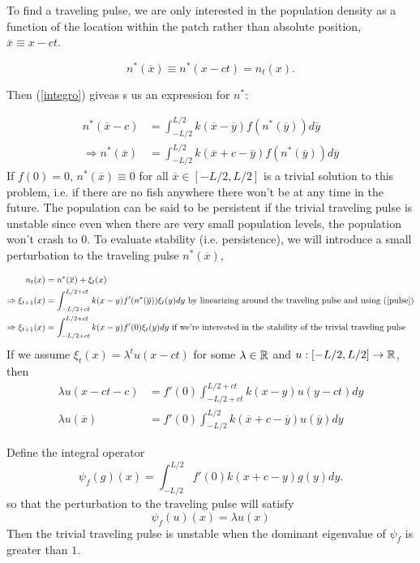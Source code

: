 \documentclass[12pt,english]{article}
\begin{document}
To find a traveling pulse, we are only interested in the population density as a function of the location within the patch rather than absolute position, $\overline{x}\equiv x-ct$.

\begin{equation}n^*(\overline{x})\equiv n^*(x-ct)=n_t(x).   \label{trav} \end{equation}

Then (\ref{integro}) giveas s us an expression for $n^*$:

\begin{align*}
n^*(\overline{x}-c)&=\int_{-L/2}^{L/2}k(\overline{x}-\overline{y})f(n^*(\overline{y}))d\overline y 
\\ \Rightarrow n^*(\overline{x})&=\int_{-L/2}^{L/2}k(\overline{x}+c-\overline{y})f(n^*(\overline{y}))d\overline y \tag{*} \label{pulse}
\end{align*}
If $f(0)=0$, $n^*(\overline{x})\equiv 0$ for all $\overline{x}\in[-L/2,L/2]$ is a trivial solution to this problem, i.e. if there are no fish anywhere there won't be at any time in the future. The population can be said to be persistent if the trivial traveling pulse is unstable since even when there are very small population levels, the population won't crash to $0$.  To evaluate stability (i.e. persistence), we will introduce a small perturbation to the traveling pulse $n^*(\overline{x})$,

\begin{align*}
n_t(x)&=n^*(\overline{x})+\xi_t(x)
\\ \Rightarrow \xi_{t+1}(x)&=\int_{-L/2+ct}^{L/2+ct}k(x-y)f'(n^*(\overline{y}))\xi_t(y)dy \text{ by linearizing around the traveling pulse and using (\ref{pulse})}
\\ \Rightarrow \xi_{t+1}(x)&=\int_{-L/2+ct}^{L/2+ct}k(x-y)f'(0)\xi_t(y)dy \text{ if we're interested in the stability of the trivial traveling pulse}
\end{align*}
If we assume $\xi_t(x)=\lambda^tu(x-ct)$ for some $\lambda\in{\mathbb{R}}$ and $u:[-L/2,L/2]\to{\mathbb{R}}$, then 
\begin{align*}
\lambda u(x-ct-c)&=f'(0)\int_{-L/2+ct}^{L/2+ct}k(x-y)u(y-ct)dy
\\ \lambda u(\overline{x})&=f'(0)\int_{-L/2}^{L/2}k(\overline{x}+c-\overline{y})u(\overline{y})dy
\end{align*}

Define the integral operator
$$ \psi_f(g)(x)=\int_{-L/2}^{L/2}f'(0)k(x+c-y)g(y)dy. $$
so that the perturbation to the traveling pulse will satisfy 
\begin{equation} \psi_f(u)(x)=\lambda u(x) \label{eigen} \end{equation}
Then the trivial traveling pulse is unstable when the dominant eigenvalue of $\psi_f$ is greater than $1$.
\end{document}
